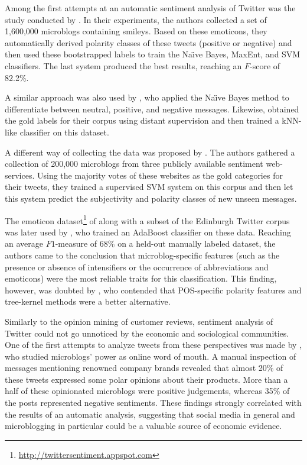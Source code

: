 Among the first attempts at an automatic sentiment analysis of Twitter
was the study conducted by \citet{Go:09}.  In their experiments, the
authors collected a set of 1,600,000 microblogs containing smileys.
Based on these emoticons, they automatically derived polarity classes
of these tweets (positive or negative) and then used these
bootstrapped labels to train the Na\"{\i}ve Bayes, MaxEnt, and SVM
classifiers.  The last system produced the best results, reaching an
$F$-score of 82.2\%.

A similar approach was also used by \citet{Pak:10}, who applied the
Na\"{\i}ve Bayes method to differentiate between neutral, positive,
and negative messages.  Likewise, \citet{Davidov:10} obtained the gold
labels for their corpus using distant supervision and then trained a
kNN-like classifier on this dataset.

A different way of collecting the data was proposed by
\citet{Barbosa:10}.  The authors gathered a collection of 200,000
microblogs from three publicly available sentiment web-services.
Using the majority votes of these websites as the gold categories for
their tweets, they trained a supervised SVM system on this corpus and
then let this system predict the subjectivity and polarity classes of
new unseen messages.

The emoticon
dataset\footnote{\url{http://twittersentiment.appspot.com}} of
\citet{Go:09} along with a subset of the Edinburgh Twitter corpus
\cite{Petrovic:10} was later used by \citet{Kouloumpis:11}, who
trained an AdaBoost classifier on these data.  Reaching an average
$F1$-measure of 68\% on a held-out manually labeled dataset, the
authors came to the conclusion that microblog-specific features (such
as the presence or absence of intensifiers or the occurrence of
abbreviations and emoticons) were the most reliable traits for this
classification.  This finding, however, was doubted by
\citet{Agarwal:11}, who contended that POS-specific polarity features
and tree-kernel methods were a better alternative.

Similarly to the opinion mining of customer reviews, sentiment
analysis of Twitter could not go unnoticed by the economic and
sociological communities.  One of the first attempts to analyze tweets
from these perspectives was made by \citet{Jansen:09}, who studied
microblogs' power as online word of mouth.  A manual inspection of
messages mentioning renowned company brands revealed that almost 20\%
of these tweets expressed some polar opinions about their products.
More than a half of these opinionated microblogs were positive
judgements, whereas 35\% of the posts represented negative sentiments.
These findings strongly correlated with the results of an automatic
analysis, suggesting that social media in general and microblogging in
particular could be a valuable source of economic evidence.

